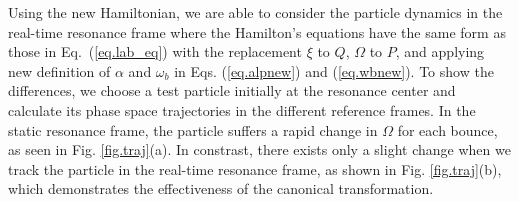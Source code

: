  Using the new Hamiltonian, we are able to consider  the particle dynamics in the real-time resonance frame
 where the Hamilton's equations have the same form as those in Eq.~(\ref{eq.lab_eq}) with the replacement $\xi$ to $Q$, $\Omega$ to $P$, and applying new definition of $\alpha$ and  ${\omega_{b}}$ in Eqs. (\ref{eq.alpnew}) and (\ref{eq.wbnew}).
To show the differences, we choose a test particle initially at the resonance center and calculate its phase space trajectories in the different reference frames. In the static resonance frame, the particle suffers a rapid change in $\Omega$  for each bounce, as seen   in Fig. \ref{fig.traj}(a). In constrast, there exists only a slight change when we track the particle in the real-time resonance frame, as shown in Fig. \ref{fig.traj}(b), which demonstrates the effectiveness of the canonical transformation.

